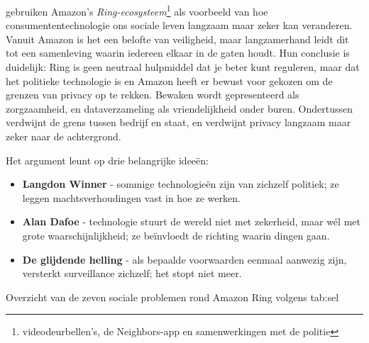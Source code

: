 \documentclass[nonacm, sigconf, balance=true]{acmart}
\begin{document}
    \parencite{selinger2022amazon} gebruiken Amazon's \textit{Ring-ecosysteem}\footnote{videodeurbellen's, de Neighbors-app en samenwerkingen met de politie} als voorbeeld van hoe consumententechnologie ons sociale leven langzaam maar zeker kan veranderen.
    Vanuit Amazon is het een belofte van veiligheid, maar langzamerhand leidt dit tot een samenleving waarin iedereen elkaar in de gaten houdt.
    Hun conclusie is duidelijk: Ring is geen neutraal hulpmiddel dat je beter kunt reguleren, maar dat het politieke technologie is en Amazon heeft er bewust voor gekozen om de grenzen van privacy op te rekken.
    Bewaken wordt gepresenteerd als zorgzaamheid, en dataverzameling als vriendelijkheid onder buren.
    Ondertussen verdwijnt de grens tussen bedrijf en staat, en verdwijnt privacy langzaam maar zeker naar de achtergrond.

    \vsmall

    \noindent Het argument leunt op drie belangrijke ideeën:
    \begin{itemize}
        \item \textbf{Langdon Winner} - sommige technologieën zijn van zichzelf politiek; ze leggen machtsverhoudingen vast in hoe ze werken.
        \item \textbf{Alan Dafoe} - technologie stuurt de wereld niet met zekerheid, maar wél met grote waarschijnlijkheid; ze beïnvloedt de richting waarin dingen gaan.
        \item \textbf{De glijdende helling} - als bepaalde voorwaarden eenmaal aanwezig zijn, versterkt surveillance zichzelf; het stopt niet meer.
    \end{itemize}

    \vsmall

    \begin{SimpleTable}[s{0.3}s{1.2}]
    {Overzicht van de zeven sociale problemen rond Amazon Ring volgens \citeauthor{selinger2022amazon}}
    {tab:sel}
    \end{SimpleTable}
\end{document}
